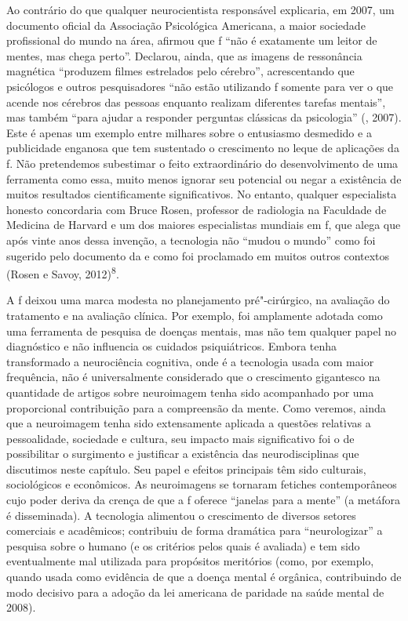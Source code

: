 Ao contrário do que qualquer neurocientista responsável explicaria, em
2007, um documento oficial da Associação Psicológica Americana, a maior
sociedade profissional do mundo na área, afirmou que f ``não é
exatamente um leitor de mentes, mas chega perto''. Declarou, ainda, que
as imagens de ressonância magnética ``produzem filmes estrelados pelo
cérebro'', acrescentando que psicólogos e outros pesquisadores ``não
estão utilizando f somente para ver o que acende nos cérebros das
pessoas enquanto realizam diferentes tarefas mentais'', mas também
``para ajudar a responder perguntas clássicas da psicologia'' (,
2007). Este é apenas um exemplo entre milhares sobre o entusiasmo
desmedido e a publicidade enganosa que tem sustentado o crescimento no
leque de aplicações da f. Não pretendemos subestimar o feito
extraordinário do desenvolvimento de uma ferramenta como essa, muito
menos ignorar seu potencial ou negar a existência de muitos resultados
cientificamente significativos. No entanto, qualquer especialista
honesto concordaria com Bruce Rosen, professor de radiologia na
Faculdade de Medicina de Harvard e um dos maiores especialistas mundiais
em f, que alega que após vinte anos dessa invenção, a tecnologia não
``mudou o mundo'' como foi sugerido pelo documento da  e como foi
proclamado em muitos outros contextos (Rosen e Savoy,
2012)\textsuperscript{8}.

A f deixou uma marca modesta no planejamento pré"-cirúrgico, na
avaliação do tratamento e na avaliação clínica. Por exemplo, foi
amplamente adotada como uma ferramenta de pesquisa de doenças mentais,
mas não tem qualquer papel no diagnóstico e não influencia os cuidados
psiquiátricos. Embora tenha transformado a neurociência cognitiva, onde
é a tecnologia usada com maior frequência, não é universalmente
considerado que o crescimento gigantesco na quantidade de artigos sobre
neuroimagem tenha sido acompanhado por uma proporcional contribuição
para a compreensão da mente. Como veremos, ainda que a neuroimagem tenha
sido extensamente aplicada a questões relativas a pessoalidade,
sociedade e cultura, seu impacto mais significativo foi o de
possibilitar o surgimento e justificar a existência das neurodisciplinas
que discutimos neste capítulo. Seu papel e efeitos principais têm sido
culturais, sociológicos e econômicos. As neuroimagens se tornaram
fetiches contemporâneos cujo poder deriva da crença de que a f
oferece ``janelas para a mente'' (a metáfora é disseminada). A
tecnologia alimentou o crescimento de diversos setores comerciais e
acadêmicos; contribuiu de forma dramática para ``neurologizar'' a
pesquisa sobre o humano (e os critérios pelos quais é avaliada) e tem
sido eventualmente mal utilizada para propósitos meritórios (como, por
exemplo, quando usada como evidência de que a doença mental é orgânica,
contribuindo de modo decisivo para a adoção da lei americana de paridade
na saúde mental de 2008).

